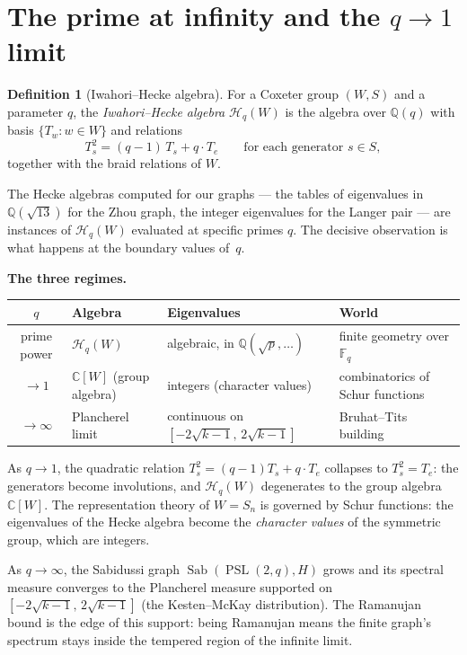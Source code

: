 \documentclass[11pt,a4paper]{article}
\theoremstyle{plain}
\theoremstyle{definition}
\newtheorem{definition}[theorem]{Definition}
\newcommand{\Sab}{\operatorname{Sab}}
\newcommand{\PSL}{\operatorname{PSL}}
\begin{document}
\section{The prime at infinity and the $q \to 1$ limit}

\begin{tcolorbox}[breakable, colback=green!8, colframe=green!8,
  boxrule=0pt, sharp corners]
\begin{definition}[Iwahori--Hecke algebra]
For a Coxeter group $(W, S)$ and a parameter $q$, the
\emph{Iwahori--Hecke algebra} $\mathcal{H}_q(W)$ is the algebra
over $\mathbb{Q}(q)$ with basis $\{T_w : w \in W\}$ and relations
\[
  T_s^2 = (q-1)\,T_s + q \cdot T_e
  \qquad \text{for each generator } s \in S,
\]
together with the braid relations of $W$.
\end{definition}
\end{tcolorbox}

The Hecke algebras computed for our graphs --- the tables of eigenvalues
in $\mathbb{Q}(\sqrt{13})$ for the Zhou graph, the integer eigenvalues
for the Langer pair --- are instances of $\mathcal{H}_q(W)$ evaluated
at specific primes $q$. The decisive observation is what happens at
the boundary values of~$q$.

\begin{tcolorbox}[breakable, colback=yellow!12, colframe=yellow!12,
  boxrule=0pt, sharp corners]
\textbf{The three regimes.}

\medskip
\begin{center}
\renewcommand{\arraystretch}{1.4}
\begin{tabular}{@{}clll@{}}
\toprule
$q$ & Algebra & Eigenvalues & World \\
\midrule
prime power & $\mathcal{H}_q(W)$ & algebraic, in $\mathbb{Q}(\sqrt{p}, \ldots)$
  & finite geometry over $\mathbb{F}_q$ \\
$\to 1$ & $\mathbb{C}[W]$ (group algebra) & integers (character values)
  & combinatorics of Schur functions \\
$\to \infty$ & Plancherel limit & continuous on $[-2\sqrt{k{-}1},\, 2\sqrt{k{-}1}]$
  & Bruhat--Tits building \\
\bottomrule
\end{tabular}
\end{center}

\medskip
As $q \to 1$, the quadratic relation $T_s^2 = (q-1)T_s + q \cdot T_e$
collapses to $T_s^2 = T_e$: the generators become involutions, and
$\mathcal{H}_q(W)$ degenerates to the group algebra $\mathbb{C}[W]$.
The representation theory of $W = S_n$ is governed by Schur functions:
the eigenvalues of the Hecke algebra become the \emph{character values}
of the symmetric group, which are integers.

As $q \to \infty$, the Sabidussi graph $\Sab(\PSL(2,q), H)$ grows and
its spectral measure converges to the Plancherel measure supported on
$[-2\sqrt{k-1},\, 2\sqrt{k-1}]$ (the Kesten--McKay distribution).
The Ramanujan bound is the edge of this support: being Ramanujan means
the finite graph's spectrum stays inside the tempered region of the
infinite limit.
\end{tcolorbox}
\end{document}
